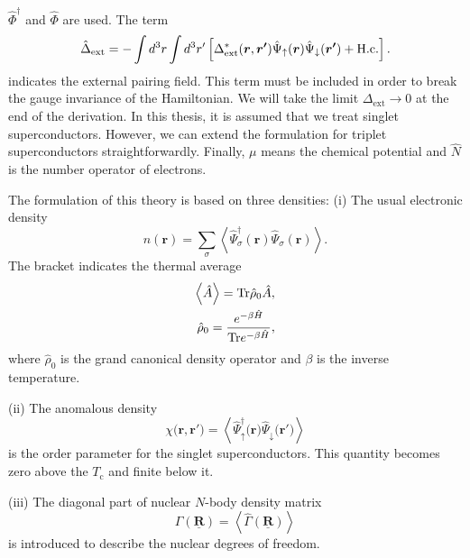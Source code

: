 $\hat{\Phi}^\dag$ and $\hat{\Phi}$ are used. The term
%
\begin{equation} %
	\hat{\Delta}_\mathrm{ext} = - \int d^3r \int d^3r' \left[\Delta^{\ast}_\mathrm{ext}(\bm{r}, \bm{r'})
	                                                                            \hat{\Psi}_\uparrow(\bm{r})\hat{\Psi}_\downarrow(\bm{r'})
	                                                                            + \rm{H.c.} \right].
\end{equation} 
%
indicates the external pairing field. This term must be included in order to break the gauge invariance of
the Hamiltonian. We will take the limit $\Delta_\mathrm{ext} \to 0$ at the end of the derivation.
In this thesis, it is assumed that we treat singlet superconductors. However,  we can extend the formulation 
for triplet superconductors straightforwardly.
Finally, $\mu$ means the chemical potential and $\hat{N}$ is the number operator of electrons. 

The formulation of this theory is based on three densities: (i) The usual electronic density 
%
\begin{equation} %
	n\left(\bm{r}\right) = \sum_{\sigma}\left<\hat{\Psi}^\dag_\sigma \left(\bm{r}\right)
	                                                               \hat{\Psi}_\sigma \left(\bm{r}\right) \right>.
\end{equation}
%
The bracket indicates the thermal average
%
\begin{equation}
\begin{split}
	\left< \hat{A} \right> = {\rm Tr}\hat{\rho}_0\hat{A}, \\
	\hat{\rho}_0 = \frac{e^{-\beta\hat{H}}}{{\rm Tr}e^{-\beta\hat{H}}},
\end{split}
\end{equation}
%
where $\hat{\rho}_0$ is the grand canonical density operator and $\beta$ is the inverse temperature.

(ii) The anomalous density
%
\begin{equation} %
	\chi \bigl(\bm{r}, \bm{r'} \bigr) = \left<\hat{\Psi}^\dag_\uparrow \bigl(\bm{r}\bigr)
	                                                    \hat{\Psi}_\downarrow \bigl(\bm{r'}\bigr) \right>
\end{equation}
%
is the order parameter for the singlet superconductors. This quantity becomes zero above the $T_\mathrm{c}$ and finite below it.

(iii) The diagonal part of nuclear $N$-body density matrix
%
\begin{equation} %
	\Gamma(\underline{\bm{R}}) = \left<\hat{\Gamma}(\underline{\bm{R}}) \right>
\end{equation}
%
is introduced to describe the nuclear degrees of freedom.

